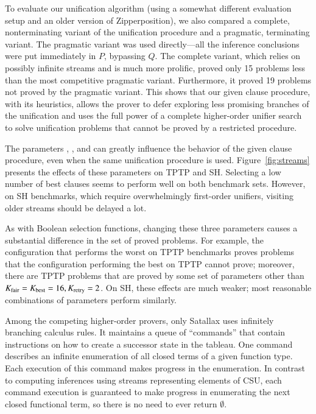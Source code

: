 To evaluate our unification algorithm (using a somewhat different
evaluation setup and an older version of Zipperposition), we also compared a complete, nonterminating variant of the
unification procedure and a pragmatic, terminating variant. The
pragmatic variant was used directly---all the inference conclusions were put
immediately in $P$, bypassing $Q$. The complete variant, which relies on
possibly infinite streams and is much more prolific, proved only 15  problems
less than the most competitive pragmatic variant. Furthermore, it proved 19
problems not proved by the pragmatic variant.
%
This shows that our given clause procedure, with its heuristics, allows the
prover to defer exploring less promising branches of the unification and uses
the full power of a complete higher-order unifier search to solve unification
problems that cannot be proved by a restricted procedure.

The parameters \ParamMode{}, \ParamRetry{}, and \ParamMaxStreams{} can greatly
influence the behavior of the given clause procedure, even when the same
unification procedure is used. Figure~\ref{fig:streams}
presents the effects of these parameters on TPTP and SH.
Selecting a low number of best clauses seems to
perform well on both benchmark sets. However, on SH benchmarks, which require
overwhelmingly first-order unifiers, visiting older streams should be delayed
a lot.

As with Boolean selection functions, changing these three parameters causes
a substantial difference in the set of proved problems. For example, the
configuration that performs the worst on TPTP benchmarks proves 
problems that the configuration performing the best on TPTP cannot prove; moreover, there
are  TPTP problems that are proved by some set of parameters
other than $K_{\mathrm{fair}}=K_{\mathrm{best}}=16, K_{\mathrm{retry}}=2$. On SH, these
effects are much weaker; most reasonable combinations
of parameters perform similarly.

Among the competing higher-order provers, only Satallax uses infinitely
branching calculus rules. It maintains a queue of ``commands'' that contain
instructions on how to create a successor state in the tableau. One
command describes an infinite enumeration of all closed terms of a given function
type. Each execution of this command makes progress in the enumeration. In contrast to
computing inferences using streams representing elements of CSU, each command execution
is guaranteed to make progress in enumerating the next closed functional
term, so there is no need to ever return $\emptyset$.



